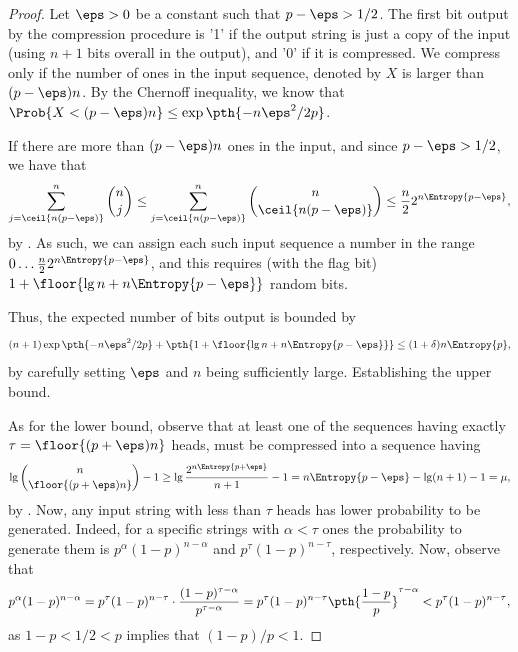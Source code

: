 \begin{proof}
    Let $\eps > 0$ be a constant such that $p -\eps > 1/2$. The first
    bit output by the compression procedure is '1' if the output
    string is just a copy of the input (using $n+1$ bits overall in
    the output), and '0' if it is compressed. We compress only if the
    number of ones in the input sequence, denoted by $X$ is larger than
    $(p-\eps)n$. By the Chernoff inequality, we know that 
    $\Prob{X < (p-\eps)n} \leq \exp \pth{-n \eps^2/2p}$.

    If there are more than $(p-\eps)n$ ones in the input, and since
    $p-\eps>1/2$, we have that
    \begin{equation*}
    \sum_{j=\ceil{n (p-\eps)}}^{n} \binom{n}{j} \leq 
    \sum_{j=\ceil{n (p-\eps)}}^{n} \binom{n}{\ceil{n (p-\eps)}}
    \leq \frac{n}{2} 2^{n \Entropy{p-\eps}},
    \end{equation*}
    by . As such, we can assign each such
    input sequence a number in the range $0 \ldots \frac{n}{2} 2^{n
       \Entropy{p-\eps}}$, and this requires (with the flag bit) $1 +
    \floor{\lg n + n \Entropy{p-\eps}}$ random bits.
    
    Thus, the expected number of bits output is bounded by
    \begin{equation*}
    (n+1)\exp \pth{-n \eps^2/2p} + \pth{1 + \floor{\lg n + n
          \Entropy{p-\eps}}} \leq (1+\delta) n \Entropy{p},
    \end{equation*}
    by carefully setting $\eps$ and $n$ being sufficiently
    large. Establishing the upper bound.

    As for the lower bound, observe that at least one of the sequences
    having exactly $\tau = \floor{(p + \eps)n}$ heads, must be
    compressed into a sequence having
    \begin{equation*}
    \lg \binom{n}{\floor{(p+\eps)n}} - 1 \geq \lg
    \frac{2^{n\Entropy{p+\eps}}}{n+1} - 1 = n\Entropy{p-\eps} - \lg (n+1) -
    1 = \mu,
    \end{equation*}
    by . Now, any input string with less than
    $\tau$ heads has lower probability to be generated. Indeed, for a
    specific strings with $\alpha < \tau$ ones the probability to
    generate them is $p^\alpha (1-p)^{n-\alpha}$ and $p^\tau
    (1-p)^{n-\tau}$, respectively. Now, observe that
    \begin{equation*}
        p^\alpha (1-p)^{n-\alpha}%
        =%
        p^{\tau}(1-p)^{n-\tau}\cdot\frac{(1-p)^{\tau - \alpha}}{p^{\tau-\alpha}}
        =%
        p^{\tau}(1-p)^{n-\tau} \pth{\frac{1-p}{p}}^{\tau-\alpha}
        <%
        p^{\tau}(1-p)^{n-\tau},
    \end{equation*}
    as $1-p < 1/2 < p$ implies that $(1-p)/p < 1$.


\end{proof}
